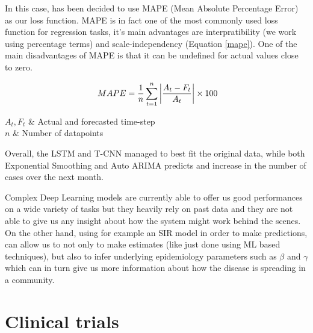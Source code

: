 In this case, has been decided to use MAPE (Mean Absolute Percentage Error) as our loss function. 
MAPE is in fact one of the most commonly used loss function for regression tasks, it's main advantages are interpratibility (we work using percentage terms) and scale-independency (Equation \ref{mape}). One of the main disadvantages of MAPE is that it can be undefined for actual values close to zero.

\useshortskip
\begin{align}
\ MAPE = \dfrac{1}{n} \sum_{t=1}^{n} \abs{\frac{A_{t}-F_{t}}{A_{t}}} \times 100
\label{mape}
\end{align}
\vspace{-0.4cm}
\begin{conditions}
 $A_{t}, F_{t}$  &  Actual and forecasted time-step \\
 $n$  &  Number of datapoints\\
\end{conditions}
\vspace{-0.2cm}
\useshortskip

Overall, the LSTM and T-CNN managed to best fit the original data, while both Exponential Smoothing and Auto ARIMA predicts and increase in the number of cases over the next month.

Complex Deep Learning models are currently able to offer us good performances on a wide variety of tasks but they heavily rely on past data and they are not able to give us any insight about how the system might work behind the scenes. On the other hand, using for example an SIR model in order to make predictions, can allow us to not only to make estimates (like just done using ML based techniques), but also to infer underlying epidemiology parameters such as $\beta$ and $\gamma$ which can in turn give us more information about how the disease is spreading in a community.

\vspace{-0.2cm}
\section{Clinical trials}


